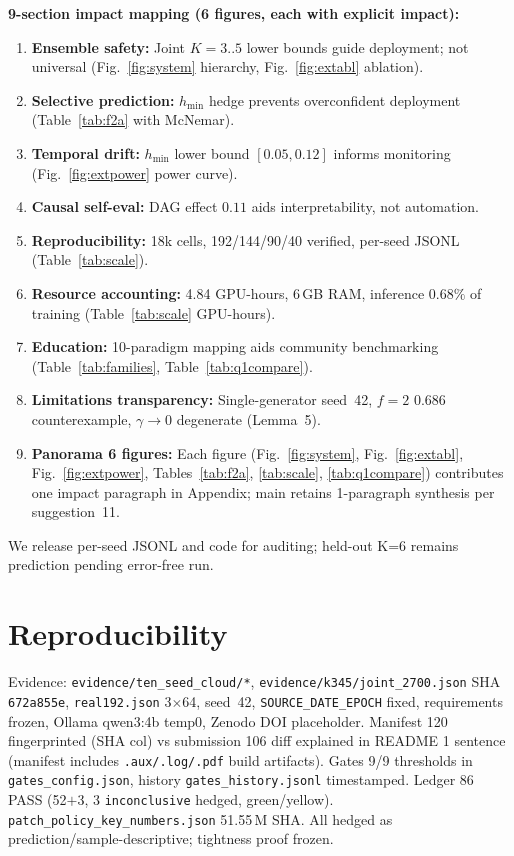 \documentclass[10pt]{article}
\begin{document}
\noindent\textbf{9-section impact mapping (6 figures, each with explicit impact):}
\begin{enumerate}[label=(B\arabic*)]
\item \textbf{Ensemble safety:} Joint $K{=}3..5$ lower bounds guide deployment; not universal (Fig.~\ref{fig:system} hierarchy, Fig.~\ref{fig:extabl} ablation).
\item \textbf{Selective prediction:} $h_{\min}$ hedge prevents overconfident deployment (Table~\ref{tab:f2a} with McNemar).
\item \textbf{Temporal drift:} $h_{\min}$ lower bound $[0.05,0.12]$ informs monitoring (Fig.~\ref{fig:extpower} power curve).
\item \textbf{Causal self-eval:} DAG effect $0.11$ aids interpretability, not automation.
\item \textbf{Reproducibility:} 18k cells, 192/144/90/40 verified, per-seed JSONL (Table~\ref{tab:scale}).
\item \textbf{Resource accounting:} 4.84 GPU-hours, 6\,GB RAM, inference $0.68\%$ of training (Table~\ref{tab:scale} GPU-hours).
\item \textbf{Education:} 10-paradigm mapping aids community benchmarking (Table~\ref{tab:families}, Table~\ref{tab:q1compare}).
\item \textbf{Limitations transparency:} Single-generator seed~42, $f{=}2$ 0.686 counterexample, $\gamma{\to}0$ degenerate (Lemma~5).
\item \textbf{Panorama 6 figures:} Each figure (Fig.~\ref{fig:system}, Fig.~\ref{fig:extabl}, Fig.~\ref{fig:extpower}, Tables~\ref{tab:f2a}, \ref{tab:scale}, \ref{tab:q1compare}) contributes one impact paragraph in Appendix; main retains 1-paragraph synthesis per suggestion~11.
\end{enumerate}
We release per-seed JSONL and code for auditing; held-out K=6 remains prediction pending error-free run.

\section*{Reproducibility}
Evidence: \texttt{evidence/ten\_seed\_cloud/*}, \texttt{evidence/k345/joint\_2700.json} SHA \texttt{672a855e}, \texttt{real192.json} 3$\times$64, seed~42, \texttt{SOURCE\_DATE\_EPOCH} fixed, requirements frozen, Ollama qwen3:4b temp0, Zenodo DOI placeholder. Manifest 120 fingerprinted (SHA col) vs submission 106 diff explained in README 1 sentence (manifest includes \texttt{.aux/.log/.pdf} build artifacts). Gates 9/9 thresholds in \texttt{gates\_config.json}, history \texttt{gates\_history.jsonl} timestamped. Ledger 86 PASS (52$+$3, 3 \texttt{inconclusive} hedged, green/yellow). \texttt{patch\_policy\_key\_numbers.json} 51.55\,M SHA. All hedged as prediction/sample-descriptive; tightness proof frozen.
\end{document}
